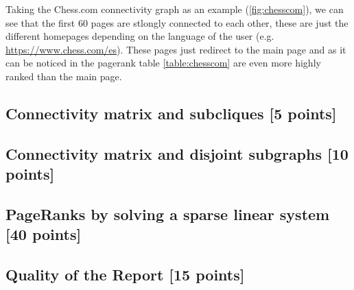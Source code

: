 \documentclass[unicode,11pt,a4paper,oneside,numbers=endperiod,openany]{scrartcl}
\begin{document}
Taking the Chess.com connectivity graph as an example (\ref{fig:chesscom}), we can see that the first 60 pages are stlongly connected to each other, 
these are just the different homepages depending on the language of the user (e.g. \url{https://www.chess.com/es}). 
These pages just redirect to the main page and as it can be noticed in the pagerank table \ref{table:chesscom} are even more highly ranked than the main page.


\subsection{Connectivity matrix and subcliques [5 points]}

\subsection{Connectivity matrix and disjoint subgraphs [10 points]}

\subsection{PageRanks by solving a sparse linear system [40 points]}

\subsection{Quality of the Report [15 points]}
\end{document}
